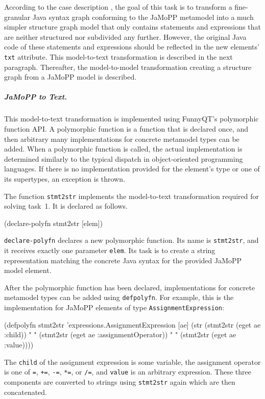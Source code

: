 \documentclass[submission]{eptcs}
\begin{document}
According to the case description \cite{flowgraphcasedesc}, the goal of this
task is to transform a fine-granular Java syntax graph conforming to the JaMoPP
metamodel \cite{jamopp09} into a much simpler structure graph model that only
contains statements and expressions that are neither structured nor subdivided
any further.  However, the original Java code of these statements and
expressions should be reflected in the new elements' \verb|txt| attribute.
This model-to-text transformation is described in the next paragraph.
Thereafter, the model-to-model transformation creating a structure graph from a
JaMoPP model is described.


\subparagraph{JaMoPP to Text.}
\label{sec:jamopp-text}

This model-to-text transformation is implemented using FunnyQT's polymorphic
function API.  A polymorphic function is a function that is declared once, and
then arbitrary many implementations for concrete metamodel types can be added.
When a polymorphic function is called, the actual implementation is determined
similarly to the typical dispatch in object-oriented programming languages.  If
there is no implementation provided for the element's type or one of its
supertypes, an exception is thrown.

The function \verb|stmt2str| implements the model-to-text transformation
required for solving task~1.  It is declared as follows.

\begin{clojurecode}
(declare-polyfn stmt2str [elem])
\end{clojurecode}

\verb|declare-polyfn| declares a new polymorphic function.  Its name is
\verb|stmt2str|, and it receives exactly one parameter \verb|elem|.  Its task
is to create a string representation matching the concrete Java syntax for the
provided JaMoPP model element.

After the polymorphic function has been declared, implementations for concrete
metamodel types can be added using \verb|defpolyfn|.  For example, this is the
implementation for JaMoPP elements of type \verb|AssignmentExpression|:

\begin{clojurecode}
(defpolyfn stmt2str 'expressions.AssignmentExpression [ae]
  (str (stmt2str (eget ae :child)) " "
       (stmt2str (eget ae :assignmentOperator)) " "
       (stmt2str (eget ae :value))))
\end{clojurecode}

The \verb|child| of the assignment expression is some variable, the assignment
operator is one of \verb|=|, \verb|+=|, \verb|-=|, \verb|*=|, or \verb|/=|, and
\verb|value| is an arbitrary expression.  These three components are converted
to strings using \verb|stmt2str| again which are then concatenated.
\end{document}
